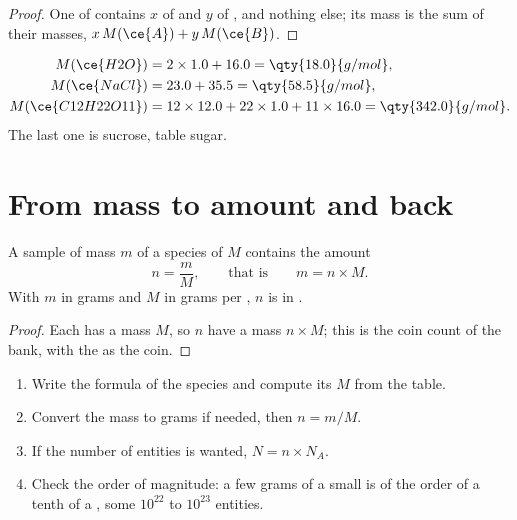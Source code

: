 \begin{proof}
One  of   contains $x$  of   and
$y$  of  , and nothing else; its mass is the sum of their
masses, $x\,M(\ce{A}) + y\,M(\ce{B})$.
\end{proof}

\begin{example}\label{ex:g10:the-mole:three}
\begin{align*}
  M(\ce{H2O}) &= 2 \times 1.0 + 16.0 = \qty{18.0}{g/mol},\\
  M(\ce{NaCl}) &= 23.0 + 35.5 = \qty{58.5}{g/mol},\\
  M(\ce{C12H22O11}) &= 12 \times 12.0 + 22 \times 1.0 + 11 \times 16.0
     = \qty{342.0}{g/mol}.
\end{align*}
The last one is sucrose, table sugar.
\end{example}

\section{From mass to amount and back}

\begin{proposition}\label{prop:g10:the-mole:mass}
A sample of mass $m$ of a species of  $M$ contains the amount
\[
  n = \frac{m}{M}, \qquad\text{that is}\qquad m = n \times M .
\]
With $m$ in grams and $M$ in grams per , $n$ is in .
\end{proposition}

\begin{proof}
Each  has a mass $M$, so $n$  have a mass $n \times M$; this is
the coin count of the bank, with the  as the coin.
\end{proof}

\begin{method}\label{met:g10:the-mole:mass-to-number}
\begin{enumerate}
  \item Write the formula of the species and compute its  $M$
        from the table.
  \item Convert the mass to grams if needed, then $n = m / M$.
  \item If the number of entities is wanted, $N = n \times N_A$.
  \item Check the order of magnitude: a few grams of a small  is
        of the order of a tenth of a , some $10^{22}$ to $10^{23}$
        entities.
\end{enumerate}
\end{method}

